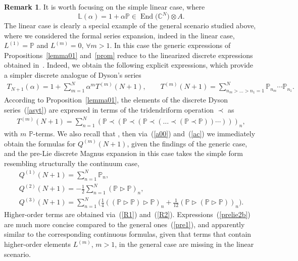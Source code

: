 \documentclass[10pt,a4paper]{amsart}
\numberwithin{equation}{section}
\theoremstyle{definition}
\newtheorem{rem}[thm]{Remark}
\DeclareMathOperator{\EEnd}{End}%
\def\mathfrak#1{#1}%
\def\mathcal#1{#1}%
\begin{document}
\begin{rem}{\label{remark12}} It is worth focusing on the simple linear case, where
\[
{\mathbb L}(\alpha) = 1 + \alpha {\mathbb P} \in \EEnd\bigl({\mathbb C}^{\mathcal N}\bigr) \otimes {\mathfrak A}.
\]
The linear case is clearly a special example of the general scenario studied above, where we considered the formal series expansion, \smash{${\mathbb L}(\alpha) =1 + \sum_{m=1}^{\infty}\alpha^m L^{(m)} \in \EEnd\bigl({\mathbb C}^{\mathcal N}\bigr) \otimes {\mathfrak A};$} indeed in the linear case, $L^{(1)} = {\mathbb P}$ and $L^{(m)} =0$, $\forall m>1$. In this case the generic expressions of Propositions~\ref{lemma01} and~\ref{prom} reduce to the linearized discrete expressions obtained in~\cite{EbraMan}.
Indeed, we obtain the following explicit expressions, which provide a simpler discrete analogue of Dyson's series
\begin{gather}
T_{N+1}(\alpha) = 1 + \sum_{m=1}^N\alpha^{m} T^{(m)}(N+1), \qquad T^{(m)}(N+1) =
\sum_{n_m>\dots>n_1=1}^{N} {\mathbb P}_{n_m} \cdots {\mathbb P}_{n_1}. \label{asyt}
\end{gather}
According to Proposition~\ref{lemma01}, the elements of the discrete Dyson series~(\ref{asyt})
are expressed in terms of the tridendriform operation $\prec $ as
\begin{gather}
T^{(m)}(N+1) = \sum_{n =1}^N ({\mathbb P}\prec ({\mathbb P}\prec
({\mathbb P} \prec (\dots \prec({\mathbb P} \prec {\mathbb P})) \cdots )) )_n, \label{dendr1}
\end{gather}
with $m$ ${\mathbb P}$-terms. We also recall that \smash{$T := {\rm e}^{{\mathcal Q}}$}, then via~(\ref{a00}) and~(\ref{ac})
we immediately obtain the formulas for ${\mathcal Q}^{(m)}(N+1)$, given the findings of the generic case,
and the pre-Lie discrete Magnus expansion in this case takes the simple form resembling structurally the continuum case,
\begin{gather}
 {\mathcal Q}^{(1)}(N+1) = \sum_{n=1}^N{\mathbb P}_n, \\
 {\mathcal Q}^{(2)}(N+1) =-\frac{1}{2} \sum_{n=1}^N ( {\mathbb P} \triangleright {\mathbb P})_n, \nonumber\\
 {\mathcal Q}^{(3)}(N+1)= \sum_{n=1}^N\biggl(
\frac{1}{4} (({\mathbb P} \triangleright {\mathbb P}) \triangleright {\mathbb P} )_n + \frac{1}{12} ({\mathbb P} \triangleright ({\mathbb P} \triangleright {\mathbb P}) )_n \biggr).\label{prelie2b}
\end{gather}
Higher-order terms are obtained via~(\ref{R1}) and~(\ref{R2}). Expressions~(\ref{prelie2b}) are much more concise compared to the general ones~(\ref{pre1}), and apparently similar to the corresponding continuous formulas,
given that {terms that contain higher-order elements $L^{(m)}$, $m>1$, in the general case} are missing in the linear scenario.
\end{rem}
\end{document}

